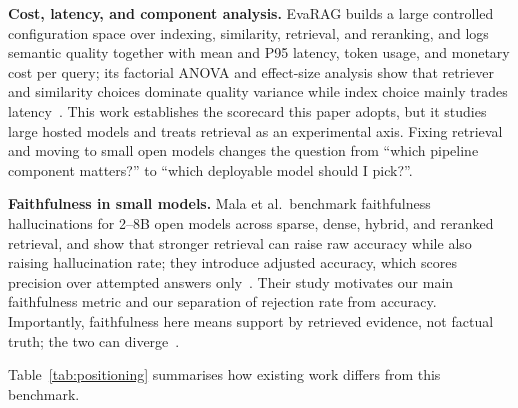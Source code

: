 \textbf{Cost, latency, and component analysis.}
EvaRAG builds a large controlled configuration space over indexing,
similarity, retrieval, and reranking, and logs semantic quality together
with mean and P95 latency, token usage, and monetary cost per
query; its factorial ANOVA and effect-size analysis show that
retriever and similarity choices dominate quality variance while
index choice mainly trades latency~\cite{elkiran2026empirical}. This
work establishes the scorecard this paper adopts, but it studies large
hosted models and treats retrieval as an experimental axis. Fixing
retrieval and moving to small open models changes the question from
``which pipeline component matters?'' to ``which deployable model should
I pick?''.

\textbf{Faithfulness in small models.}
Mala et al.\ benchmark faithfulness hallucinations for 2--8B open models
across sparse, dense, hybrid, and reranked retrieval, and show that
stronger retrieval can raise raw accuracy while also raising
hallucination rate; they introduce adjusted accuracy, which scores
precision over attempted answers only~\cite{mala2026faithfulness}.
Their study motivates our main faithfulness metric and our separation of
rejection rate from accuracy. Importantly, faithfulness here means
support by retrieved evidence, not factual truth; the two can diverge~\cite{murugaraj2025ragvue}.

Table~\ref{tab:positioning} summarises how existing work differs from
this benchmark.


